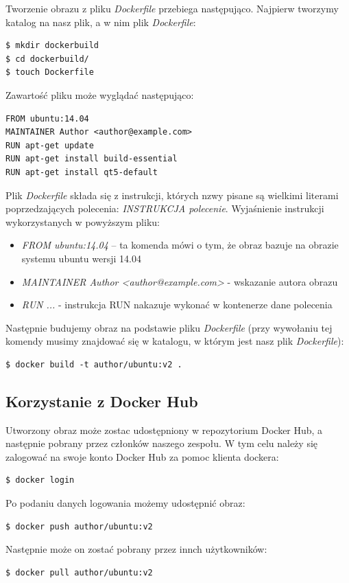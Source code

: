 Tworzenie obrazu z pliku \textit{Dockerfile} przebiega następująco. Najpierw tworzymy katalog na nasz plik, a w nim plik \textit{Dockerfile}:
\begin{lstlisting}[style=incode]
$ mkdir dockerbuild
$ cd dockerbuild/
$ touch Dockerfile
\end{lstlisting}
Zawartość pliku może wyglądać następująco:
\begin{lstlisting}[style=incode]
FROM ubuntu:14.04
MAINTAINER Author <author@example.com>
RUN apt-get update 
RUN apt-get install build-essential 
RUN apt-get install qt5-default
\end{lstlisting}
Plik \textit{Dockerfile} składa się z instrukcji, których nzwy pisane są wielkimi literami poprzedzających polecenia: \textit{INSTRUKCJA polecenie}. Wyjaśnienie instrukcji wykorzystanych w powyższym pliku:
\begin{itemize}

\item \textit{FROM ubuntu:14.04} – ta komenda mówi o tym, że obraz bazuje na obrazie systemu ubuntu wersji 14.04
\item \textit{MAINTAINER Author <author@example.com>} - wskazanie autora obrazu
\item \textit{RUN ...} - instrukcja RUN nakazuje wykonać w kontenerze dane polecenia
\end{itemize}
Następnie budujemy obraz na podstawie pliku \textit{Dockerfile} (przy wywołaniu tej komendy musimy znajdować się w katalogu, w którym jest nasz plik \textit{Dockerfile}):
\begin{lstlisting}[style=incode]
$ docker build -t author/ubuntu:v2 .
\end{lstlisting}


\subsection{Korzystanie z Docker Hub}

Utworzony obraz może zostac udostępniony w repozytorium Docker Hub, a następnie pobrany przez członków naszego zespołu. W tym celu należy się zalogować na swoje konto Docker Hub za pomoc klienta dockera:
\begin{lstlisting}[style=incode]
$ docker login
\end{lstlisting}
Po podaniu danych logowania możemy udostępnić obraz:
\begin{lstlisting}[style=incode]
$ docker push author/ubuntu:v2
\end{lstlisting}
Następnie może on zostać pobrany przez innch użytkowników:
\begin{lstlisting}[style=incode]
$ docker pull author/ubuntu:v2
\end{lstlisting}
